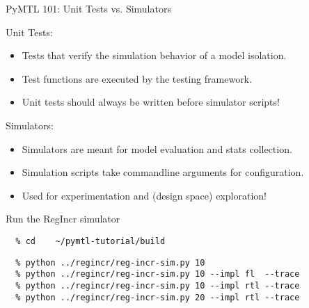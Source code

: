 \begin{frame}{PyMTL 101: Unit Tests vs. Simulators}

Unit Tests: 
\begin{itemize}
  \item Tests that verify the simulation behavior of a model isolation.
  \item Test functions are executed by the  testing framework.
  \item Unit tests should always be written before simulator scripts!
\end{itemize}

\vspace{0.2in}

Simulators: 
\begin{itemize}
  \item Simulators are meant for model evaluation and stats collection.
  \item Simulation scripts take commandline arguments for configuration.
  \item Used for experimentation and (design space) exploration!
\end{itemize}

\end{frame}

\begin{task}\begin{frame}[fragile]{Run the RegIncr simulator}
\vspace{-0.25in}
\begin{verbatim}
  % cd    ~/pymtl-tutorial/build
\end{verbatim}

\begin{verbatim}
  % python ../regincr/reg-incr-sim.py 10
  % python ../regincr/reg-incr-sim.py 10 --impl fl  --trace
  % python ../regincr/reg-incr-sim.py 10 --impl rtl --trace
  % python ../regincr/reg-incr-sim.py 20 --impl rtl --trace
\end{verbatim}
\end{frame}
\end{task}

